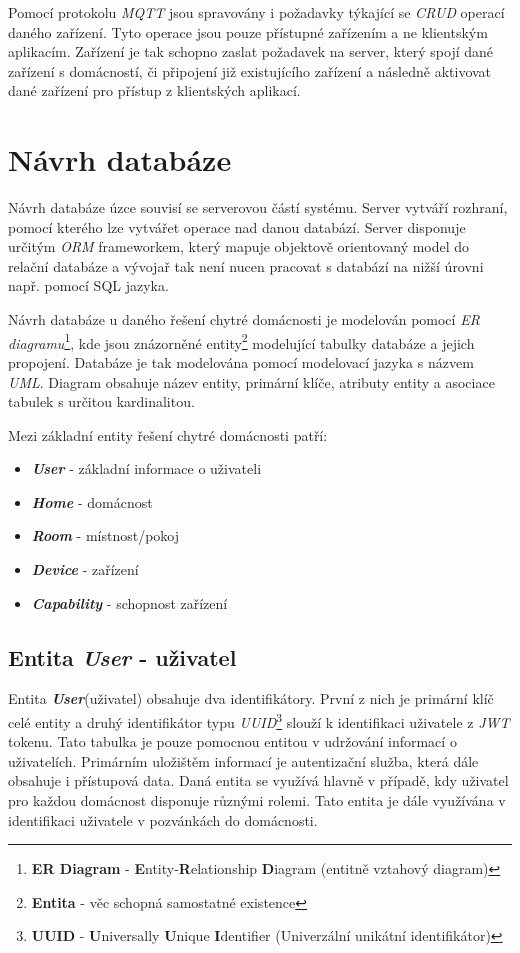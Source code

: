 Pomocí protokolu \emph{MQTT} jsou spravovány i požadavky týkající se \emph{CRUD} operací daného zařízení.
Tyto operace jsou pouze přístupné zařízením a ne klientským aplikacím.
Zařízení je tak schopno zaslat požadavek na server, který spojí dané zařízení s domácností, či připojení již existujícího zařízení a následně aktivovat dané zařízení pro přístup z klientských aplikací.

\newpage
\section{Návrh databáze}
\label{navrh:databaze}

Návrh databáze úzce souvisí se serverovou částí systému. Server vytváří rozhraní, pomocí kterého lze vytvářet operace nad danou databází.
Server disponuje určitým \emph{ORM} frameworkem, který mapuje objektově orientovaný model do relační databáze a vývojař tak není nucen pracovat s databází na nižší úrovni např. pomocí SQL jazyka.

Návrh databáze u daného řešení chytré domácnosti je modelován pomocí \emph{ER diagramu}\footnote{\textbf{ER Diagram} - \textbf{E}ntity-\textbf{R}elationship \textbf{D}iagram (entitně vztahový diagram)}, kde jsou znázorněné entity\footnote{\textbf{Entita} - věc schopná samostatné existence} modelující tabulky databáze a jejich propojení.
Databáze je tak modelována pomocí modelovací jazyka s názvem \emph{UML}.
Diagram obsahuje název entity, primární klíče, atributy entity a asociace tabulek s určitou kardinalitou.

Mezi základní entity řešení chytré domácnosti patří:
\begin{itemize}
  \item \textbf{\emph{User}} - základní informace o uživateli
  \item \textbf{\emph{Home}} - domácnost
  \item \textbf{\emph{Room}} - místnost/pokoj
  \item \textbf{\emph{Device}} - zařízení
  \item \textbf{\emph{Capability}} - schopnost zařízení
\end{itemize}

\subsection*{Entita \emph{User} - uživatel}
\label{databaze:user}
Entita \textbf{\emph{User}}(uživatel) obsahuje dva identifikátory. První z nich je primární klíč celé entity a druhý identifikátor typu \emph{UUID}\footnote{\textbf{UUID} - \textbf{U}niversally \textbf{U}nique \textbf{I}dentifier (Univerzální unikátní identifikátor)} slouží k identifikaci uživatele z \emph{JWT} tokenu.
Tato tabulka je pouze pomocnou entitou v udržování informací o uživatelích. Primárním uložištěm informací je autentizační služba, která dále obsahuje i přístupová data.
Daná entita se využívá hlavně v případě, kdy uživatel pro každou domácnost disponuje různými rolemi. Tato entita je dále využívána v identifikaci uživatele v pozvánkách do domácnosti.

